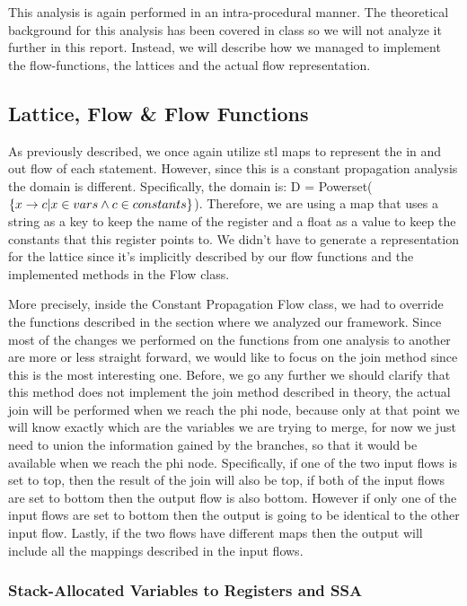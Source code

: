 This analysis is again performed in an intra-procedural manner. The theoretical background for this analysis has been covered in class so we will not analyze it further in this report. Instead, we will describe how we managed to implement the flow-functions, the lattices and the actual flow representation. 


\subsection{Lattice, Flow \& Flow Functions}
As previously described, we once again utilize stl maps to represent the in and out flow of each statement. However, since this is a constant propagation analysis the domain is different. Specifically, the domain is: D = Powerset($\{x\rightarrow c|x\in vars \wedge c\in constants\}$). Therefore, we are using a map that uses a string as a key to keep the name of the register and a float as a value to keep the constants that this register points to. We didn't have to generate a representation for the lattice since it's implicitly described by our flow functions and the implemented methods in the Flow class. 

More precisely, inside the Constant Propagation Flow class, we had to override the functions described in the section where we analyzed our framework. Since most of the changes we performed on the functions from one analysis to another are more or less straight forward, we would like to focus on the join method since this is the most interesting one. Before, we go any further we should clarify that this method does not implement the join method described in theory, the actual join will be performed when we reach the phi node, because only at that point we will know exactly which are the variables we are trying to merge, for now we just need to union the information gained by the branches, so that it would be available when we reach the phi node. Specifically, if one of the two input flows is set to top, then the result of the join will also be top, if both of the input flows are set to bottom then the output flow is also bottom. However if only one of the input flows are set to bottom then the output is going to be identical to the other input flow. Lastly, if the two flows have different maps then the output will include all the mappings described in the input flows. 

\subsubsection*{Stack-Allocated Variables to Registers and SSA}

